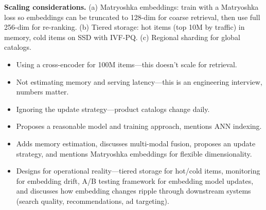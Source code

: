 \begin{interviewq}
\textbf{Scaling considerations.} (a) Matryoshka embeddings: train with a Matryoshka loss so embeddings can be truncated to 128-dim for coarse retrieval, then use full 256-dim for re-ranking. (b) Tiered storage: hot items (top 10M by traffic) in memory, cold items on SSD with IVF-PQ. (c) Regional sharding for global catalogs.

\redflags
\begin{itemize}
    \item Using a cross-encoder for 100M items---this doesn't scale for retrieval.
    \item Not estimating memory and serving latency---this is an engineering interview, numbers matter.
    \item Ignoring the update strategy---product catalogs change daily.
\end{itemize}


\goodgreat
\begin{itemize}
    \item {} Proposes a reasonable model and training approach, mentions ANN indexing.
    \item {} Adds memory estimation, discusses multi-modal fusion, proposes an update strategy, and mentions Matryoshka embeddings for flexible dimensionality.
    \item {} Designs for operational reality---tiered storage for hot/cold items, monitoring for embedding drift, A/B testing framework for embedding model updates, and discusses how embedding changes ripple through downstream systems (search quality, recommendations, ad targeting).
\end{itemize}

\end{interviewq}



